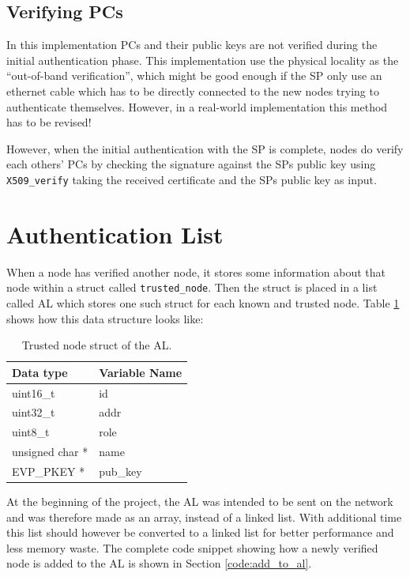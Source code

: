 \subsection{Verifying PCs}
In this implementation PCs and their public keys are not verified during the
initial authentication phase. This implementation use the physical locality as
the ``out-of-band verification'', which might be good enough if the SP only
use an ethernet cable which has to be directly connected to the new nodes trying
to authenticate themselves. However, in a real-world implementation this method
has to be revised!

However, when the initial authentication with the SP is complete, nodes do
verify each others' PCs by checking the signature against the SPs public key
using \texttt{X509\_verify} taking the received certificate and the SPs public
key as input.

\section{Authentication List}
When a node has verified another node, it stores some information about that
node within a struct called \texttt{trusted\_node}. Then the struct is placed in
a list called \ac{AL} which stores one such struct for each known and trusted
node. Table \ref{tab:impl_al_content} shows how this data structure looks like:
\begin{table}[h]
	\centering
	\begin{tabular}{| l | l |}\hline
 		\textbf{Data type} & \textbf{Variable Name}\\\hline
		uint16\_t & id\\\hline
		uint32\_t & addr\\\hline
		uint8\_t & role\\\hline 
		unsigned char * & name\\\hline 
		EVP\_PKEY * & pub\_key\\\hline  
	\end{tabular}
	\caption{Trusted node struct of the AL.}
	\label{tab:impl_al_content}
\end{table}
At the beginning of the project, the AL was intended to be sent on the network
and was therefore made as an array, instead of a linked list. With additional
time this list should however be converted to a linked list for better
performance and less memory waste. The complete code snippet showing how a newly
verified node is added to the AL is shown in Section \ref{code:add_to_al}.


